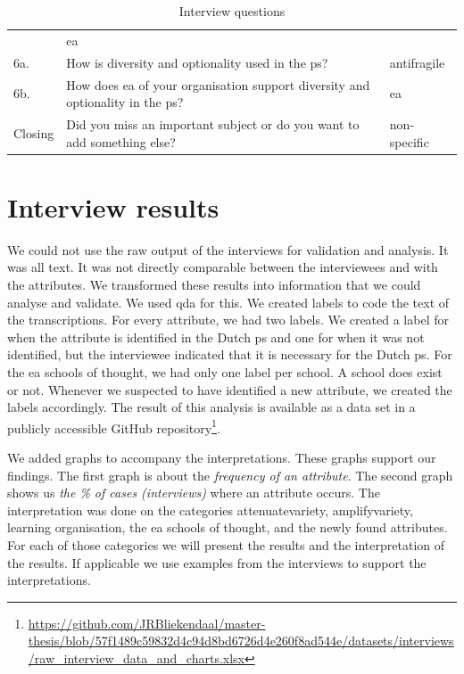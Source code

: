 \begin{table}[H]
{\begin{tabular}{@{}p{}p{}p{}@{}}
			& \acrshort{ea} \\%
			6a. & How is \gls{diversity} and \gls{optionality} used in the \gls{ps}? & \Gls{antifragile} \\%
			6b. & How does \acrshort{ea} of your organisation support \gls{diversity} and \gls{optionality} in the \gls{ps}? & \acrshort{ea} \\%
			Closing & Did you miss an important subject or do you want to add something else? & non-specific \\%
			\bottomrule
		\end{tabular}
	}%
		\caption[Interview questions]{Interview questions}
		\label{tab:interviewquestions}
\end{table}
\section{Interview results}
\label{sec:interviewresults}
We could not use the raw output of the interviews for validation and analysis. It was all text. It was not directly comparable between the interviewees and with the \glspl{attribute}. We transformed these results into information that we could analyse and validate. We used \acrlong{qda} for this. We created labels to code the text of the transcriptions. For every attribute, we had two labels. We created a label for when the attribute is identified in the Dutch \gls{ps} and one for when it was not identified, but the interviewee indicated that it is necessary for the Dutch \gls{ps}. For the \gls{ea} schools of thought, we had only one label per school. A school does exist or not. Whenever we suspected to have identified a new attribute, we created the labels accordingly. The result of this analysis is available as a data set in a publicly accessible GitHub repository\footnote{\url{https://github.com/JRBliekendaal/master-thesis/blob/57f1489c59832d4c94d8bd6726d4e260f8ad544e/datasets/interviews/raw_interview_data_and_charts.xlsx}}.  

We added graphs to accompany the interpretations. These graphs support our findings. The first graph is about the \textit{frequency of an \gls{attribute}}. The second graph shows us \textit{the \% of cases (interviews)} where an \gls{attribute} occurs. The interpretation was done on the categories \gls{attenuatevariety}, \gls{amplifyvariety}, learning organisation, the \acrlong{ea} schools of thought, and the newly found \glspl{attribute}. For each of those categories we will present the results and the interpretation of the results. If applicable we use examples from the interviews to support the interpretations.

